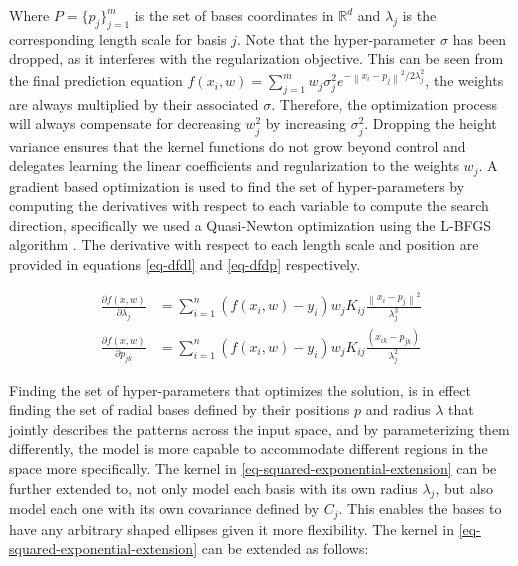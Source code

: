 \documentclass[useAMS,usenatbib,fleqn]{mn2e}
\begin{document}
Where $P=\{p_{j}\}_{j=1}^{m}$ is the set of bases coordinates in $\mathbb{R}^{d}$ and $\lambda_{j}$ is the corresponding length scale for basis $j$. Note that the hyper-parameter $\sigma$ has been dropped, as it interferes with the regularization objective. This can be seen from the final prediction equation $f(x_{i},w)=\sum_{j=1}^{m}w_{j}\sigma_{j}^{2}e^{-\left\| x_{i}-p_{j}\right\|^{2}/2\lambda_{j}^{2}}$, the weights are always multiplied by their associated $\sigma$. Therefore, the optimization process will always compensate for decreasing $w_{j}^{2}$ by increasing $\sigma_{j}^{2}$. Dropping the height variance ensures that the kernel functions do not grow beyond control and delegates learning the linear coefficients and regularization to the weights $w_{j}$. A gradient based optimization is used to find the set of hyper-parameters by computing the derivatives with respect to each variable to compute the search direction, specifically we used a Quasi-Newton optimization using the L-BFGS algorithm \cite{}. The derivative with respect to each length scale and position are provided in equations \eqref{eq-dfdl} and \eqref{eq-dfdp} respectively. 

\begin{subequations}
\begin{align} 
\label{eq-dfdl}
\frac{\partial f(x,w)}{\partial \lambda_{j}} &= \sum_{i=1}^{n}\left(f(x_{i},w)-y_{i}\right)w_{j}K_{ij}\frac{\left\| x_{i}-p_{j}\right\|^{2}}{\lambda_{j}^{3}}\\
\label{eq-dfdp}
\frac{\partial f(x,w)}{\partial p_{jk}} &= \sum_{i=1}^{n}\left(f(x_{i},w)-y_{i}\right)w_{j}K_{ij}\frac{(x_{ik}-p_{jk})}{\lambda_{j}^{2}}
\end{align}
\end{subequations}


Finding the set of hyper-parameters that optimizes the solution, is in effect finding the set of radial bases defined by their positions $p$ and radius $\lambda$ that jointly describes the patterns across the input space, and by parameterizing them differently, the model is more capable to accommodate different regions in the space more specifically. The kernel in \eqref{eq-squared-exponential-extension} can be further extended to, not only model each basis with its own radius $\lambda_{j}$, but also model each one with its own covariance defined by $C_{j}$. This enables the bases to have any arbitrary shaped ellipses given it more flexibility. The kernel in \eqref{eq-squared-exponential-extension} can be extended as follows:
\end{document}
